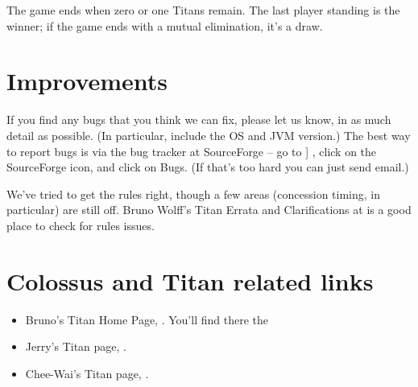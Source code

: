 \documentclass{article}
\begin{document}
The game ends when zero or one Titans remain. The last player standing is
the winner; if the game ends with a mutual elimination, it's a draw.

\section{Improvements}

If you find any bugs that you think we can fix, please let us know, in
as much detail as possible. (In particular, include the OS and JVM 
version.) The best way to report bugs is via the bug tracker at 
SourceForge -- go to ]
,
click on the SourceForge icon, and click on Bugs. (If that's too hard
you can just send email.)

We've tried to get the rules right, though a few areas (concession timing,
in particular) are still off. Bruno Wolff's Titan Errata and Clarifications at
is a good place to check for rules issues.

\section{Colossus and Titan related links}

\begin{itemize}

\item Bruno's Titan Home Page,
.
You'll find there the

\item Jerry's Titan page,
.

\item Chee-Wai's Titan page,
.

\end{itemize}
\end{document}

